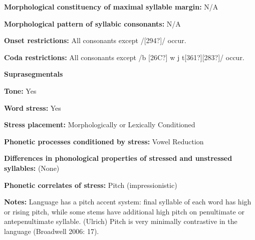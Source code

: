 \begin{styleBody}
\textbf{Morphological constituency of maximal syllable margin:} N/A
\end{styleBody}

\begin{styleBody}
\textbf{Morphological pattern of syllabic consonants:} N/A
\end{styleBody}

\begin{styleBody}
\textbf{Onset restrictions: }All consonants except /[294?]/ occur.
\end{styleBody}

\begin{styleBody}
\textbf{Coda restrictions:} All consonants except /b [26C?] w j t[361?][283?]/ occur.
\end{styleBody}

\begin{styleBody}
\textbf{Suprasegmentals}
\end{styleBody}

\begin{styleBody}
\textbf{Tone:} Yes
\end{styleBody}

\begin{styleBody}
\textbf{Word stress:} Yes
\end{styleBody}

\begin{styleBody}
\textbf{Stress placement:} Morphologically or Lexically Conditioned
\end{styleBody}

\begin{styleBody}
\textbf{Phonetic processes conditioned by stress:} Vowel Reduction
\end{styleBody}

\begin{styleBody}
\textbf{Differences in phonological properties of stressed and unstressed syllables:} (None)
\end{styleBody}

\begin{styleBody}
\textbf{Phonetic correlates of stress: }Pitch (impressionistic)
\end{styleBody}

\begin{styleBody}
\textbf{Notes:} Language has a pitch accent system: final syllable of each word has high or rising pitch, while some stems have additional high pitch on penultimate or antepenultimate syllable. (Ulrich) Pitch is very minimally contrastive in the language (Broadwell 2006: 17).
\end{styleBody}

